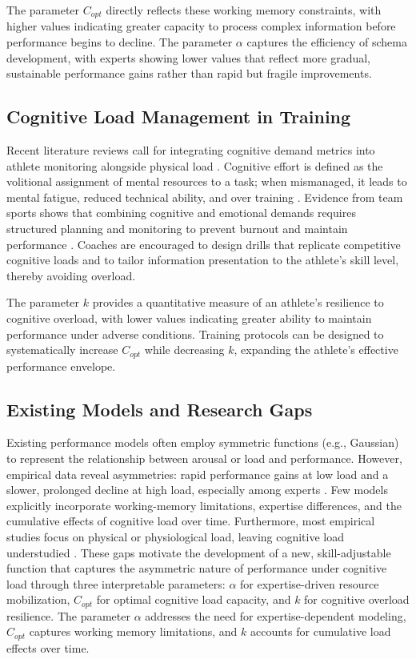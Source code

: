\documentclass{article}
\begin{document}
The parameter $C_{opt}$ directly reflects these working memory constraints, with higher values indicating greater
capacity to process complex information before performance begins to decline. The parameter $\alpha$ captures the
efficiency of schema development, with experts showing lower values that reflect more gradual, sustainable performance
gains rather than rapid but fragile improvements.

\subsection*{Cognitive Load Management in Training}  Recent literature reviews call for integrating cognitive demand
metrics into athlete monitoring alongside physical load \citep{fuster2021}.  Cognitive effort is
defined as the volitional assignment of mental resources to a task; when mismanaged, it leads to mental fatigue, reduced
technical ability, and over training \citep{beilock2001}.  Evidence from team sports shows that
combining cognitive and emotional demands requires structured planning and monitoring to prevent burnout and maintain
performance \citep{masters1992}.  Coaches are encouraged to design drills that replicate competitive
cognitive loads and to tailor information presentation to the athlete’s skill level, thereby avoiding overload.

The parameter $k$ provides a quantitative measure of an athlete's resilience to cognitive overload, with lower values
indicating greater ability to maintain performance under adverse conditions. Training protocols can be designed to
systematically increase $C_{opt}$ while decreasing $k$, expanding the athlete's effective performance envelope.

\subsection*{Existing Models and Research Gaps}

Existing performance models often employ symmetric functions (e.g., Gaussian) to represent the relationship between
arousal or load and performance. However, empirical data reveal asymmetries: rapid performance gains at low load and a
slower, prolonged decline at high load, especially among experts \citep{beilock2001}. Few models explicitly incorporate
working-memory limitations, expertise differences, and the cumulative effects of cognitive load over time. Furthermore,
most empirical studies focus on physical or physiological load, leaving cognitive load understudied \citep{fuster2021}.
These gaps motivate the development of a new, skill-adjustable function that captures the asymmetric nature of
performance under cognitive load through three interpretable parameters: $\alpha$ for expertise-driven resource
mobilization, $C_{opt}$ for optimal cognitive load capacity, and $k$ for cognitive overload resilience. The parameter
$\alpha$ addresses the need for expertise-dependent modeling, $C_{opt}$ captures working memory limitations, and $k$
accounts for cumulative load effects over time.
\end{document}
